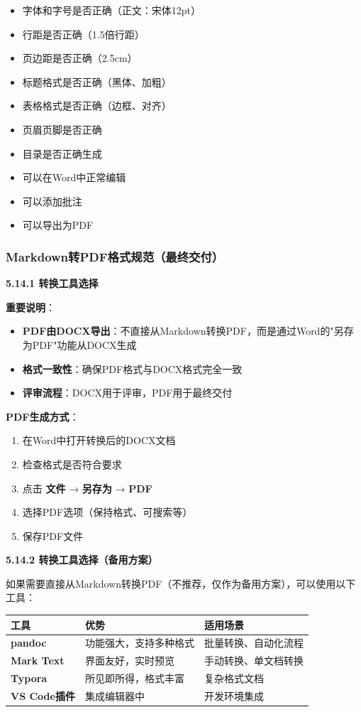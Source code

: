 \documentclass[12pt,a4paper]{article}
\numberwithin{equation}{section}  %
\begin{document}
\begin{itemize}
\item [ ] 字体和字号是否正确（正文：宋体12pt）
\item [ ] 行距是否正确（1.5倍行距）
\item [ ] 页边距是否正确（2.5cm）
\item [ ] 标题格式是否正确（黑体、加粗）
\item [ ] 表格格式是否正确（边框、对齐）
\item [ ] 页眉页脚是否正确
\item [ ] 目录是否正确生成
\item [ ] 可以在Word中正常编辑
\item [ ] 可以添加批注
\item [ ] 可以导出为PDF
\end{itemize}

\subsubsection{Markdown转PDF格式规范（最终交付）}
\textbf{5.14.1 转换工具选择}

\textbf{重要说明}：
\begin{itemize}
\item [警告] \textbf{PDF由DOCX导出}：不直接从Markdown转换PDF，而是通过Word的"另存为PDF"功能从DOCX生成
\item [正确] \textbf{格式一致性}：确保PDF格式与DOCX格式完全一致
\item [正确] \textbf{评审流程}：DOCX用于评审，PDF用于最终交付
\end{itemize}

\textbf{PDF生成方式}：
\begin{enumerate}
\item 在Word中打开转换后的DOCX文档
\item 检查格式是否符合要求
\item 点击 \textbf{文件} → \textbf{另存为} → \textbf{PDF}
\item 选择PDF选项（保持格式、可搜索等）
\item 保存PDF文件
\end{enumerate}

\textbf{5.14.2 转换工具选择（备用方案）}

如果需要直接从Markdown转换PDF（不推荐，仅作为备用方案），可以使用以下工具：

\begin{longtable}{|p{4cm}|p{5cm}|p{5cm}|}
\hline
工具 & 优势 & 适用场景 \\
\hline
\textbf{pandoc} & 功能强大，支持多种格式 & 批量转换、自动化流程 \\
\textbf{Mark Text} & 界面友好，实时预览 & 手动转换、单文档转换 \\
\textbf{Typora} & 所见即所得，格式丰富 & 复杂格式文档 \\
\textbf{VS Code插件} & 集成编辑器中 & 开发环境集成 \\
\hline
\end{longtable}
\end{document}
